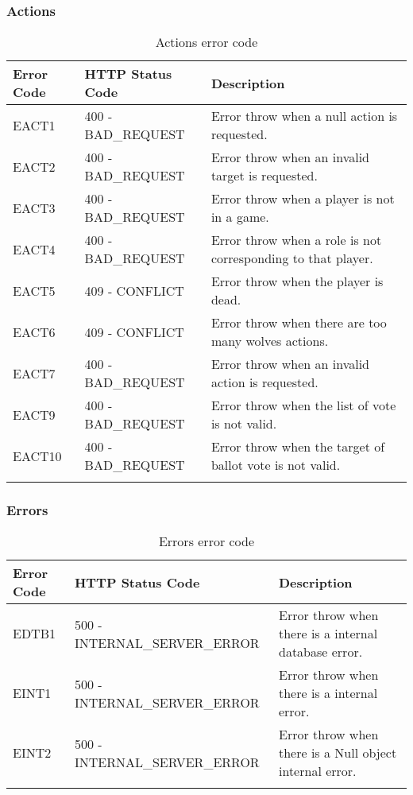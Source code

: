 \subsubsection{Actions}
\begin{longtable}{|p{}|p{} |p{}|} 
    \hline
    \textbf{Error Code} & \textbf{HTTP Status Code} & \textbf{Description} \\\hline
    EACT1 & 400 - BAD\_REQUEST & Error throw when a null action is requested.\\\hline
    EACT2 & 400 - BAD\_REQUEST & Error throw when an invalid target is requested.\\\hline
    EACT3 & 400 - BAD\_REQUEST & Error throw when a player is not in a game.\\\hline
    EACT4 & 400 - BAD\_REQUEST & Error throw when a role is not corresponding to that player.\\\hline
    EACT5 & 409 - CONFLICT & Error throw when the player is dead.\\\hline
    EACT6 & 409 - CONFLICT & Error throw when there are too many wolves actions.\\\hline
    EACT7 & 400 - BAD\_REQUEST & Error throw when an invalid action is requested.\\\hline
    EACT9 & 400 - BAD\_REQUEST & Error throw when the list of vote is not valid.\\\hline

    EACT10 & 400 - BAD\_REQUEST & Error throw when the target of ballot vote is not valid.\\\hline

    
    
    \caption{Actions error code}
    \label{tab:actions_error_code}
\end{longtable}
\subsubsection{Errors}
\begin{longtable}{|p{}|p{} |p{}|} 
    \hline
    \textbf{Error Code} & \textbf{HTTP Status Code} & \textbf{Description} \\\hline
    EDTB1 & 500 - INTERNAL\_SERVER\_ERROR & Error throw when there is a internal database error.\\\hline
    EINT1 & 500 - INTERNAL\_SERVER\_ERROR & Error throw when there is a internal error.\\\hline
    EINT2 & 500 - INTERNAL\_SERVER\_ERROR & Error throw when there is a Null object internal error.\\\hline
    \caption{Errors error code}
    \label{tab:errors_error_code}
\end{longtable}